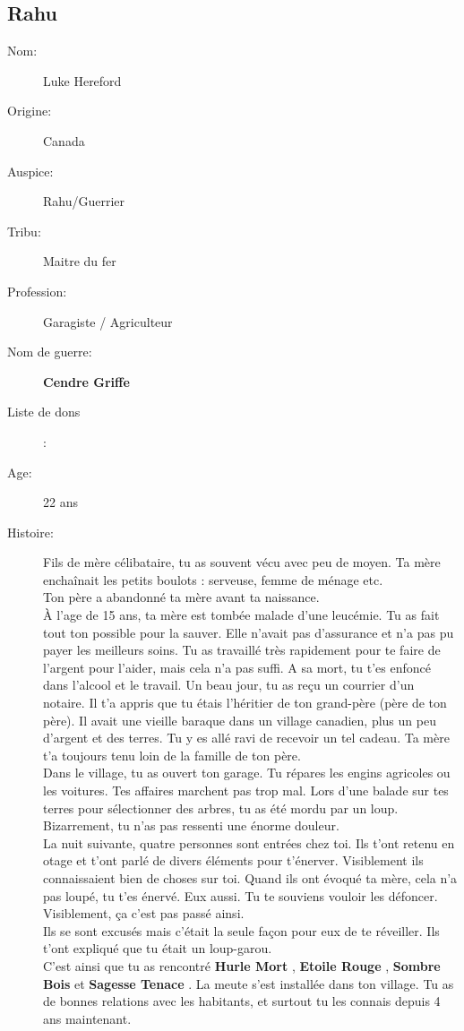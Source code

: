 \documentclass[oneside,12pt]{book}
\newcommand{\Lynn}{\textbf{Etoile Rouge} }
\newcommand{\Jessica}{\textbf{Sagesse Tenace} }
\newcommand{\Luke}{\textbf{Cendre Griffe} }
\newcommand{\Peter}{\textbf{Hurle Mort} }
\newcommand{\Leonard}{\textbf{Sombre Bois} }
\begin{document}
\begin{flushleft}
\section{Rahu}
\begin{description}
\item[Nom:]{Luke Hereford}
\item[Origine:]{Canada}
\item[Auspice:]{Rahu/Guerrier}
\item[Tribu:]{Maitre du fer}
\item[Profession:]{Garagiste / Agriculteur}
\item[Nom de guerre:]{\Luke}
\item[Liste de dons]:
\item[Age:]{22 ans}
\item[Histoire:]{
Fils de mère célibataire, tu as souvent vécu avec peu de moyen. Ta mère enchaînait les petits boulots : serveuse, femme de ménage etc.\\
Ton père a abandonné ta mère avant ta naissance.\\
 À l'age de 15 ans, ta mère est tombée malade d'une leucémie. Tu as fait tout ton possible pour la sauver. 
Elle n'avait pas d'assurance et n'a pas pu payer les meilleurs soins. Tu as travaillé très rapidement pour te faire de l'argent pour l'aider, mais cela n'a pas suffi. 
A sa mort, tu t'es enfoncé dans l'alcool et le travail. Un beau jour, tu as reçu un courrier d'un notaire. Il t'a appris que tu étais l'héritier de ton grand-père (père de ton père). Il avait une vieille baraque dans un village canadien, plus un peu d'argent et des terres. Tu y es allé ravi de recevoir un tel cadeau. Ta mère t'a toujours tenu loin de la famille de ton père. \\
Dans le village, tu as ouvert ton garage. Tu répares les engins agricoles ou les voitures. Tes affaires marchent pas trop mal. Lors d'une balade sur tes terres pour sélectionner des arbres, tu as été mordu par un loup. Bizarrement, tu n'as pas ressenti une énorme douleur. \\
La nuit suivante, quatre personnes sont entrées chez toi. Ils t'ont retenu en otage et t'ont parlé de divers éléments pour t'énerver. Visiblement ils connaissaient bien de choses sur toi.  Quand ils ont évoqué ta mère, cela n'a pas loupé, tu t'es énervé. Eux aussi. Tu te souviens vouloir les défoncer. Visiblement, ça c'est pas passé ainsi. \\
Ils se sont excusés mais c'était la seule façon pour eux de te réveiller. Ils t'ont expliqué que tu était un loup-garou.\\
 C'est ainsi que tu as rencontré \Peter , \Lynn , \Leonard et \Jessica . La meute s'est installée dans ton village.
Tu as de bonnes relations avec les habitants, et surtout tu les connais depuis 4 ans maintenant.\\

}
\end{description}
\end{flushleft}
\end{document}

